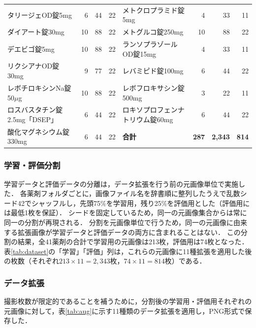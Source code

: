 \documentclass[dvipdfmx]{jsarticle}
\begin{document}
\begin{table}[htbp]
\begin{tabular}{lrrr|lrrr}
タリージェOD錠5mg & 6 & 44 & 22 & メトクロプラミド錠5mg & 4 & 33 & 11 \\
ダイアート錠30mg & 10 & 88 & 22 & メトグルコ錠250mg & 10 & 88 & 22 \\
デエビゴ錠5mg & 10 & 88 & 22 & ランソプラゾールOD錠15mg & 4 & 33 & 11 \\
リクシアナOD錠30mg & 9 & 77 & 22 & レバミピド錠100mg & 6 & 44 & 22 \\
レボチロキシンNa錠50$\mu$g & 10 & 88 & 22 & レボフロキサシン錠500mg & 3 & 22 & 11 \\
ロスバスタチン錠2.5mg「DSEP」 & 6 & 44 & 22 & ロキソプロフェンナトリウム錠60mg & 6 & 44 & 22 \\
酸化マグネシウム錠330mg & 6 & 44 & 22 & \textbf{合計} & \textbf{287} & \textbf{2,343} & \textbf{814} \\
\hline
\end{tabular}
\end{table}

\subsubsection{学習・評価分割}

学習データと評価データの分離は，データ拡張を行う前の元画像単位で実施した．
各薬剤フォルダごとに，画像ファイル名を辞書順に整列したうえで乱数シード42でシャッフルし，先頭75\%を学習用，残り25\%を評価用とした（評価用には最低1枚を保証）．
シードを固定しているため，同一の元画像集合からは常に同一の分割が再現される．
分割を元画像単位で行うため，同一の元画像に由来する拡張画像が学習データと評価データの両方に含まれることはない．
この分割の結果，全41薬剤の合計で学習用の元画像は213枚，評価用は74枚となった．表\ref{tab:dataset}の「学習」「評価」列は，これらの元画像に11種拡張を適用した後の枚数（それぞれ$213\times11=2{,}343$枚，$74\times11=814$枚）である．

\subsubsection{データ拡張}

撮影枚数が限定的であることを補うために，分割後の学習用・評価用それぞれの元画像に対して，表\ref{tab:aug}に示す11種類のデータ拡張を適用し，PNG形式で保存した．
\end{document}
